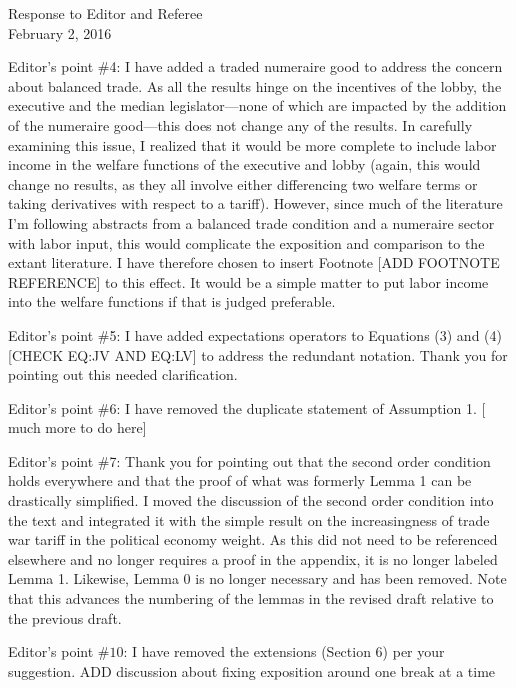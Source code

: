 \documentclass[12pt]{article}
\begin{document}
\begin{center}
\large Response to Editor and Referee \\
\normalsize February 2, 2016
\end{center}

Editor's point $\#$4: I have added a traded numeraire good to address the concern about balanced trade. As all the results hinge on the incentives of the lobby, the executive and the median legislator---none of which are impacted by the addition of the numeraire good---this does not change any of the results. In carefully examining this issue, I realized that it would be more complete to include labor income in the welfare functions of the executive and lobby (again, this would change no results, as they all involve either differencing two welfare terms or taking derivatives with respect to a tariff). However, since much of the literature I'm following abstracts from a balanced trade condition and a numeraire sector with labor input, this would complicate the exposition and comparison to the extant literature. I have therefore chosen to insert Footnote [{\color{blue}ADD FOOTNOTE REFERENCE}] to this effect. It would be a simple matter to put labor income into the welfare functions if that is judged preferable.

Editor's point $\#$5: I have added expectations operators to Equations (3) and (4) [{\color{blue}CHECK EQ:JV AND EQ:LV}] to address the redundant notation. Thank you for pointing out this needed clarification.

Editor's point $\#$6: I have removed the duplicate statement of Assumption 1. [{\color{blue} much more to do here}]

Editor's point $\#$7: Thank you for pointing out that the second order condition holds everywhere and that the proof of what was formerly Lemma 1 can be drastically simplified. I moved the discussion of the second order condition into the text and integrated it with the simple result on the increasingness of trade war tariff in the political economy weight. As this did not need to be referenced elsewhere and no longer requires a proof in the appendix, it is no longer labeled Lemma 1. Likewise, Lemma 0 is no longer necessary and has been removed. Note that this advances the numbering of the lemmas in the revised draft relative to the previous draft. 

Editor's point $\#10$: I have removed the extensions (Section 6) per your suggestion. {\color{blue}ADD discussion about fixing exposition around one break at a time}
\end{document}
